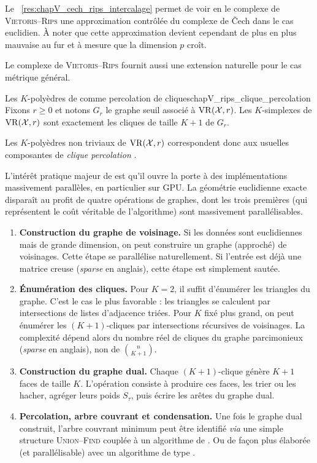Le \Res~\ref{res:chapV_cech_rips_intercalage} permet de voir en le complexe de \textsc{Vietoris--Rips} une approximation contrôlée du complexe de \v Cech dans le cas euclidien. À noter que cette approximation devient cependant de plus en plus mauvaise au fur et à mesure que la dimension $p$ croît.

Le complexe de \textsc{Vietoris--Rips} fournit aussi une extension naturelle pour le cas métrique général.

\begin{Fait}{Les $K$-polyèdres de  comme percolation de cliques}{chapV_rips_clique_percolation}
Fixons $r\ge0$ et notons $G_r$ le graphe seuil associé à $\mathrm{VR}(\mathcal{X},r)$. Les $K$-simplexes de $\mathrm{VR}(\mathcal{X},r)$ sont exactement les cliques de taille $K+1$ de $G_r$.

Les $K$-polyèdres non triviaux de $\mathrm{VR}(\mathcal{X},r)$ correspondent donc aux usuelles composantes de \emph{clique percolation} \cite{KCliquePercolation}.
\end{Fait}


L'intérêt pratique majeur de  est qu'il ouvre la porte à des implémentations massivement parallèles, en particulier sur \textsc{GPU}. La géométrie euclidienne exacte disparaît au profit de quatre opérations de graphes, dont les trois premières (qui représentent le coût véritable de l'algorithme) sont massivement parallélisables.

\begin{enumerate}
    \item \textbf{Construction du graphe de voisinage.} Si les données sont euclidiennes mais de grande dimension, on peut construire un graphe (approché) de voisinages. Cette étape se parallélise naturellement. Si l'entrée est déjà une matrice creuse (\emph{sparse} en anglais), cette étape est simplement sautée.

    \item \textbf{Énumération des cliques.} Pour $K=2$, il suffit d'énumérer les triangles du graphe. C'est le cas le plus favorable : les triangles se calculent par intersections de listes d'adjacence triées. Pour $K$ fixé plus grand, on peut énumérer les $(K+1)$-cliques par intersections récursives de voisinages. La complexité dépend alors du nombre réel de cliques du graphe parcimonieux (\emph{sparse} en anglais), non de $\binom n{K+1}$.

    \item \textbf{Construction du graphe dual.} Chaque $(K+1)$-clique génère $K+1$ faces de taille $K$. L'opération consiste à produire ces faces, les trier ou les hacher, agréger leurs poids $S_\tau$, puis écrire les arêtes du graphe dual.

    \item \textbf{Percolation, arbre couvrant et condensation.} Une fois le graphe dual construit, l'arbre couvrant minimum peut être identifié \emph{via} une simple structure \textsc{Union--Find} \cite{Tarjan1975} couplée à un algorithme de  \cite{Kruskal1956}. Ou de façon plus élaborée (et parallélisable) avec un algorithme de type .
\end{enumerate}


